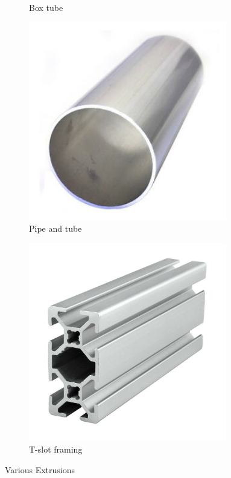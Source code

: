 \documentclass[10pt,letterpaper]{book}
\begin{document}
\begin{figure}[H]
\begin{subfigure}[b]{.24\linewidth}
		\caption{Box tube}
	\end{subfigure} \begin{subfigure}[b]{.24\linewidth}
		\includegraphics[width=0.95\textwidth]{imgs/extrusion_roundtube.jpeg}
		\caption{Pipe and tube}
	\end{subfigure}	\begin{subfigure}[b]{.24\linewidth}
		\includegraphics[width=0.95\textwidth]{imgs/extrusion_8020.jpeg}
		\caption{T-slot framing}
	\end{subfigure}	
	\caption{Various Extrusions}
\end{figure}
\end{document}
